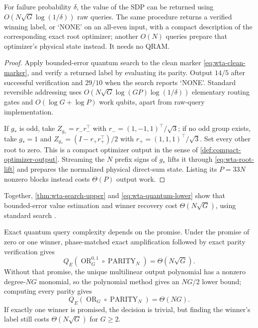 \begin{theorem}
\label{thm:wta-search-upper}
For failure probability $\delta$, the value of the SDP can be returned using
$O(N\sqrt G\log(1/\delta))$ raw queries.  The same procedure returns a verified winning label, or `NONE' on an
all-even input, with a compact description of the corresponding exact root
optimizer; another $O(N)$ queries prepare that optimizer's physical state
instead.  It needs no QRAM.
\end{theorem}

\begin{proof}
Apply bounded-error quantum search to the clean marker
\eqref{eq:wta-clean-marker}, and verify a returned label by evaluating its
parity.  Output $14/5$ after successful verification and $29/10$ when the
search reports `NONE'.  Standard reversible addressing uses
$O(N\sqrt G\log(GP)\log(1/\delta))$ elementary routing gates and
$O(\log G+\log P)$ work qubits, apart from raw-query implementation.

If $g_*$ is odd, take $Z_{g_*}=r_-r_-^\top$ with
$r_-=(1,-1,1)^\top/\sqrt3$; if no odd group exists, take $g_*=1$ and
$Z_{g_*}=(I-r_+r_+^\top)/2$ with $r_+=(1,1,1)^\top/\sqrt3$.  Set every other
root to zero.  This is a compact optimizer output in the sense of
\cref{def:compact-optimizer-output}.  Streaming the $N$ prefix signs of
$g_*$ lifts it through \eqref{eq:wta-root-lift} and prepares the normalized
physical direct-sum state.  Listing its $P=33N$ nonzero blocks instead costs
$\Theta(P)$ output work.
\end{proof}

Together, \cref{thm:wta-search-upper} and
\eqref{eq:wta-quantum-lower} show that bounded-error value
estimation and winner recovery cost $\Theta(N\sqrt G)$, using standard search
\cite{boyer1998-tight-bounds-on-quantum-searching,
durr1996-a-quantum-algorithm-for-finding}.

Exact quantum query complexity depends on the promise.  Under
the promise of zero or one winner,
phase-matched exact amplification followed by exact parity verification gives
\begin{equation}
 Q_E(\operatorname{OR}^{0,1}_G\circ\operatorname{PARITY}_N)
 =\Theta(N\sqrt G).
 \label{eq:wta-exact-promised}
\end{equation}
Without that promise, the unique multilinear output polynomial has a
nonzero degree-$NG$ monomial, so the polynomial method gives an $NG/2$
lower bound; computing every parity gives
\begin{equation}
 Q_E(\operatorname{OR}_G\circ\operatorname{PARITY}_N)=\Theta(NG).
 \label{eq:wta-exact-unrestricted}
\end{equation}
If exactly one winner is promised, the decision is trivial, but finding
the winner's label still costs
$\Theta(N\sqrt G)$ for $G\ge2$.

